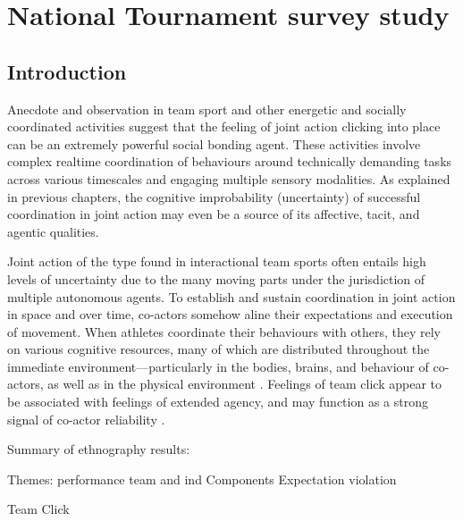 
\begin{savequote}[8cm]

  \qauthor{}
\end{savequote}


\chapter{\label{chap:tournamentSurvey}National Tournament survey study}
                                            \begin{CJK}{UTF8}{gbsn}

\minitoc

\section{Introduction}
Anecdote and observation in team sport and other energetic and socially coordinated activities suggest that the feeling of joint action clicking into place can be an extremely powerful social bonding agent.  These activities involve complex realtime coordination of behaviours around technically demanding tasks across various timescales and engaging multiple sensory modalities.  As explained in previous chapters, the cognitive improbability (uncertainty) of successful coordination in joint action may even be a source of its affective, tacit, and agentic qualities.

 Joint action of the type found in interactional team sports often entails high levels of uncertainty due to the many moving parts under the jurisdiction of multiple autonomous agents.  To establish and sustain coordination in joint action in space and over time, co-actors somehow aline their expectations and execution of movement. When athletes coordinate their behaviours with others, they rely on various cognitive resources, many of which are distributed throughout the immediate environment---particularly in the bodies, brains, and behaviour of co-actors, as well as in the physical environment \citep{Clark2015,Bourbousson2016,VanderWel2012}.  Feelings of team click appear to be associated with feelings of extended agency, and may function as a strong signal of co-actor reliability \citep{Reddish2013a}.




 Summary of ethnography results:

       Themes:
        performance
           team and ind
           Components
           Expectation violation

       Team Click


\end{CJK}
